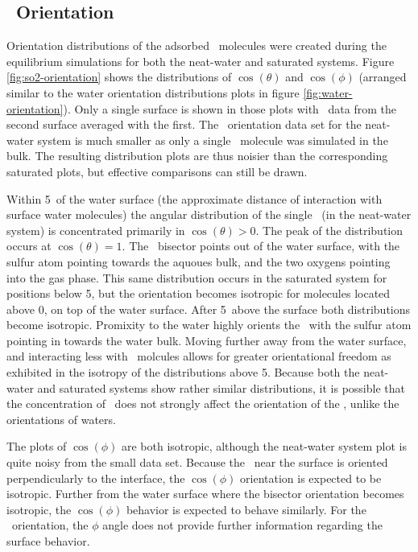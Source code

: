 \subsection{\suldiox~Orientation}

Orientation distributions of the adsorbed \suldiox~molecules were created during the equilibrium simulations for both the neat-water and saturated systems. Figure \ref{fig:so2-orientation} shows the distributions of $\cos(\theta)$ and $\cos(\phi)$ (arranged similar to the water orientation distributions plots in figure \ref{fig:water-orientation}). Only a single surface is shown in those plots with \suldiox~data from the second surface averaged with the first. The \suldiox~orientation data set for the neat-water system is much smaller as only a single \suldiox~molecule was simulated in the bulk. The resulting distribution plots are thus noisier than the corresponding saturated plots, but effective comparisons can still be drawn.

Within 5\angs~of the water surface (the approximate distance of interaction with surface water molecules) the angular distribution of the single \suldiox~(in the neat-water system) is concentrated primarily in $\cos(\theta)>0$. The peak of the distribution occurs at $\cos(\theta)=1$. The \suldiox~bisector points out of the water surface, with the sulfur atom pointing towards the aquoues bulk, and the two oxygens pointing into the gas phase. This same distribution occurs in the saturated system for positions below 5\angs, but the orientation becomes isotropic for molecules located above 0\angs, on top of the water surface. After 5\angs~above the surface both distributions become isotropic. Promixity to the water highly orients the \suldiox~with the sulfur atom pointing in towards the water bulk. Moving further away from the water surface, and interacting less with \wat~molcules allows for greater orientational freedom as exhibited in the isotropy of the distributions above 5\angs. Because both the neat-water and saturated systems show rather similar distributions, it is possible that the concentration of \suldiox~does not strongly affect the orientation of the \suldiox, unlike the orientations of waters.

The plots of $\cos(\phi)$ are both isotropic, although the neat-water system plot is quite noisy from the small data set. Because the \suldiox~near the surface is oriented perpendicularly to the interface, the $\cos(\phi)$ orientation is expected to be isotropic. Further from the water surface where the bisector orientation becomes isotropic, the $\cos(\phi)$ behavior is expected to behave similarly. For the \suldiox~orientation, the $\phi$ angle does not provide further information regarding the surface behavior.

